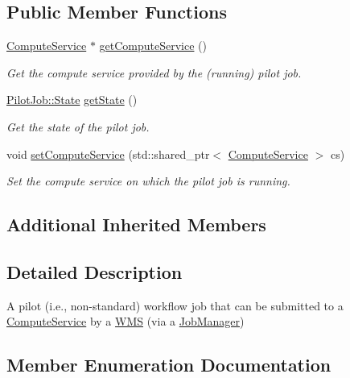 \subsection*{Public Member Functions}
\begin{DoxyCompactItemize}
\item 
\hyperlink{classwrench_1_1_compute_service}{Compute\+Service} $\ast$ \hyperlink{classwrench_1_1_pilot_job_a296881f5e960313121e9cba4b89a1e9c}{get\+Compute\+Service} ()
\begin{DoxyCompactList}\small\item\em Get the compute service provided by the (running) pilot job. \end{DoxyCompactList}\item 
\hyperlink{classwrench_1_1_pilot_job_a0540139dbc8b0a8506a87b2f55020fc8}{Pilot\+Job\+::\+State} \hyperlink{classwrench_1_1_pilot_job_a3890ff3cb3b494270c7a635748c91d95}{get\+State} ()
\begin{DoxyCompactList}\small\item\em Get the state of the pilot job. \end{DoxyCompactList}\item 
void \hyperlink{classwrench_1_1_pilot_job_afcce7670521e4d1090fe27290a075f81}{set\+Compute\+Service} (std\+::shared\+\_\+ptr$<$ \hyperlink{classwrench_1_1_compute_service}{Compute\+Service} $>$ cs)
\begin{DoxyCompactList}\small\item\em Set the compute service on which the pilot job is running. \end{DoxyCompactList}\end{DoxyCompactItemize}
\subsection*{Additional Inherited Members}


\subsection{Detailed Description}
A pilot (i.\+e., non-\/standard) workflow job that can be submitted to a \hyperlink{classwrench_1_1_compute_service}{Compute\+Service} by a \hyperlink{classwrench_1_1_w_m_s}{W\+MS} (via a \hyperlink{classwrench_1_1_job_manager}{Job\+Manager}) 

\subsection{Member Enumeration Documentation}
\mbox{\label{classwrench_1_1_pilot_job_a0540139dbc8b0a8506a87b2f55020fc8}} 
